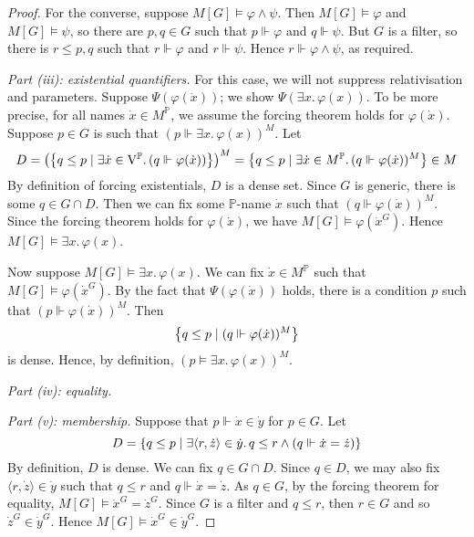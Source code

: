 \begin{proof}
    For the converse, suppose \( M[G] \vDash \varphi \wedge \psi \).
    Then \( M[G] \vDash \varphi \) and \( M[G] \vDash \psi \), so there are \( p, q \in G \) such that \( p \Vdash \varphi \) and \( q \Vdash \psi \).
    But \( G \) is a filter, so there is \( r \leq p, q \) such that \( r \Vdash \varphi \) and \( r \Vdash \psi \).
    Hence \( r \Vdash \varphi \wedge \psi \), as required.

    \emph{Part (iii): existential quantifiers.}
    For this case, we will not suppress relativisation and parameters.
    Suppose \( \Psi(\varphi(\dot x)) \); we show \( \Psi(\exists x.\, \varphi(x)) \).
    To be more precise, for all names \( \dot x \in M^{\mathbb P} \), we assume the forcing theorem holds for \( \varphi(\dot x) \).
    Suppose \( p \in G \) is such that \( (p \Vdash \exists x.\, \varphi(x))^M \).
    Let
    \[ D = \qty(\qty{q \leq p \mid \exists \dot x \in \mathrm{V}^{\mathbb P}.\, (q \Vdash \varphi(\dot x))})^M = \qty{q \leq p \mid \exists \dot x \in M^{\mathbb P}.\, (q \Vdash \varphi(\dot x))^M} \in M \]
    By definition of forcing existentials, \( D \) is a dense set.
    Since \( G \) is generic, there is some \( q \in G \cap D \).
    Then we can fix some \( \mathbb P \)-name \( \dot x \) such that \( (q \Vdash \varphi(\dot x))^M \).
    Since the forcing theorem holds for \( \varphi(\dot x) \), we have \( M[G] \vDash \varphi(\dot x^G) \).
    Hence \( M[G] \vDash \exists x.\, \varphi(x) \).

    Now suppose \( M[G] \vDash \exists x.\, \varphi(x) \).
    We can fix \( \dot x \in M^{\mathbb P} \) such that \( M[G] \vDash \varphi(\dot x^G) \).
    By the fact that \( \Psi(\varphi(\dot x)) \) holds, there is a condition \( p \) such that \( (p \Vdash \varphi(\dot x))^M \).
    Then
    \[ \qty{q \leq p \mid (q \Vdash \varphi(\dot x))^M} \]
    is dense.
    Hence, by definition, \( (p \vDash \exists x.\, \varphi(x))^M \).

    \emph{Part (iv): equality.}

    \emph{Part (v): membership.}
    Suppose that \( p \Vdash \dot x \in \dot y \) for \( p \in G \).
    Let
    \[ D = \qty{q \leq p \mid \exists \langle r, \dot z \rangle \in \dot y.\, q \leq r \wedge (q \Vdash \dot x = \dot z)} \]
    By definition, \( D \) is dense.
    We can fix \( q \in G \cap D \).
    Since \( q \in D \), we may also fix \( \langle r, \dot z \rangle \in \dot y \) such that \( q \leq r \) and \( q \Vdash \dot x = \dot z \).
    As \( q \in G \), by the forcing theorem for equality, \( M[G] \vDash \dot x^G = \dot z^G \).
    Since \( G \) is a filter and \( q \leq r \), then \( r \in G \) and so \( \dot z^G \in \dot y^G \).
    Hence \( M[G] \vDash \dot x^G \in \dot y^G \).


\end{proof}
